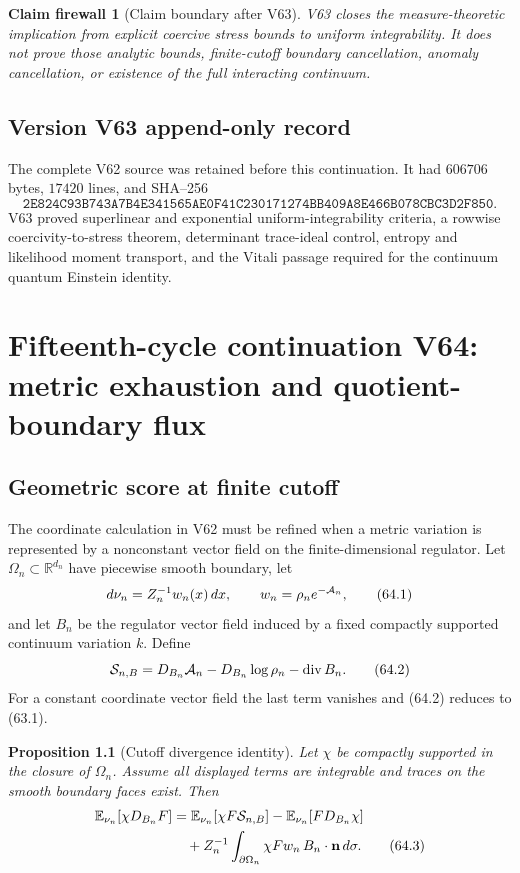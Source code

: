 \documentclass[11pt]{article}
\newtheorem{proposition}[theorem]{Proposition}
\newtheorem{firewall}[theorem]{Claim firewall}
\theoremstyle{remark}
\begin{document}
\begin{firewall}[Claim boundary after V63]
\label{fire:v15v63}
V63 closes the measure-theoretic implication from explicit
coercive stress bounds to uniform integrability.  It does not prove
those analytic bounds, finite-cutoff boundary cancellation, anomaly
cancellation, or existence of the full interacting continuum.
\end{firewall}

\section*{Version V63 append-only record}
The complete V62 source was retained before this continuation.  It
had \(606706\) bytes, \(17420\) lines, and SHA--256
\[
 \texttt{2E824C93B743A7B4E341565AE0F41C230171274BB409A8E466B078CBC3D2F850}.
\]
V63 proved superlinear and exponential uniform-integrability
criteria, a rowwise coercivity-to-stress theorem, determinant
trace-ideal control, entropy and likelihood moment transport, and
the Vitali passage required for the continuum quantum Einstein
identity.

\chapter{Fifteenth-cycle continuation V64: metric exhaustion and quotient-boundary flux}
\label{sec:v15v64}

\section{Geometric score at finite cutoff}

The coordinate calculation in V62 must be refined when a metric
variation is represented by a nonconstant vector field on the
finite-dimensional regulator.  Let
\(\Omega_n\subset{\mathbb R}^{d_n}\) have piecewise smooth boundary,
let
\[
 d\nu_n=Z_n^{-1}w_n(x)\,dx,\qquad
 w_n=\rho_n e^{-{\cal A}_n},                           \tag{64.1}
\]
and let \(B_n\) be the regulator vector field induced by a fixed
compactly supported continuum variation \(k\).  Define
\[
 {\cal S}_{n,B}
 =
 D_{B_n}{\cal A}_n-D_{B_n}\log\rho_n
 -\operatorname{div}B_n.                              \tag{64.2}
\]
For a constant coordinate vector field the last term vanishes and
(64.2) reduces to (63.1).

\begin{proposition}[Cutoff divergence identity]
\label{prop:v15v64-cutoff-div}
Let \(\chi\) be compactly supported in the closure of \(\Omega_n\).
Assume all displayed terms are integrable and traces on the smooth
boundary faces exist.  Then
\[
 \begin{split}
 \mathbb E_{\nu_n}[\chi D_{B_n}F]
 &=
 \mathbb E_{\nu_n}[\chi F{\cal S}_{n,B}]
 -\mathbb E_{\nu_n}[F D_{B_n}\chi]\\
 &\quad+
 Z_n^{-1}\int_{\partial\Omega_n}
 \chi Fw_n\,B_n\mathbin{\cdot}{\bf n}\,d\sigma .
                                                               \tag{64.3}
 \end{split}
\]
\end{proposition}
\end{document}
